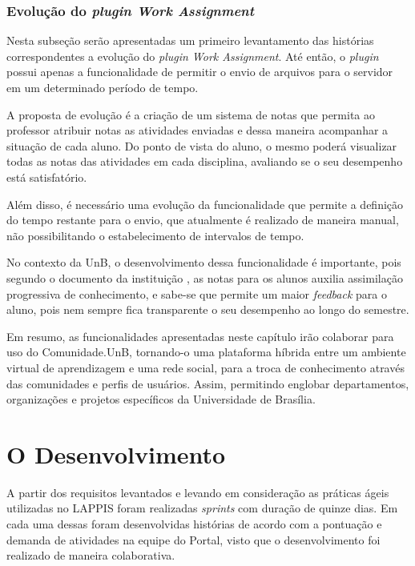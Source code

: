 \subsection{Evolução do \textit{plugin Work Assignment}}

Nesta subseção serão apresentadas um primeiro levantamento das histórias correspondentes a evolução do \textit{plugin Work Assignment}. Até então, o \textit{plugin} possui apenas a funcionalidade de permitir o envio de arquivos para o servidor em um determinado período de tempo.

A proposta de evolução é a criação de um sistema de notas que permita ao professor atribuir notas as atividades enviadas e dessa maneira acompanhar a situação de cada aluno. Do ponto de vista do aluno, o mesmo poderá visualizar todas as notas das atividades em cada disciplina, avaliando se o seu desempenho está satisfatório.

Além disso, é necessário uma evolução da funcionalidade que permite a definição do tempo restante para o envio, que atualmente é realizado de maneira manual, não possibilitando o estabelecimento de intervalos de tempo.



No contexto da UnB, o desenvolvimento dessa funcionalidade é importante, pois segundo o documento da instituição , as notas para os alunos auxilia assimilação progressiva de conhecimento, e sabe-se que permite um maior \textit{feedback} para o aluno, pois nem sempre fica transparente o seu desempenho ao longo do semestre.

Em resumo, as funcionalidades apresentadas neste capítulo irão colaborar para uso do Comunidade.UnB, tornando-o uma plataforma híbrida entre um ambiente virtual de aprendizagem e uma rede social, para a troca de conhecimento através das comunidades e perfis de usuários. Assim, permitindo englobar departamentos, organizações e projetos específicos da Universidade de Brasília.


\chapter{O Desenvolvimento}
\label{consideracoes-preliminares}

A partir dos requisitos levantados e levando em consideração as práticas ágeis utilizadas no LAPPIS foram realizadas \textit{sprints} com duração de quinze dias. Em cada uma dessas foram desenvolvidas histórias de acordo com a pontuação e demanda de atividades na equipe do Portal, visto que o desenvolvimento foi realizado de maneira colaborativa.

